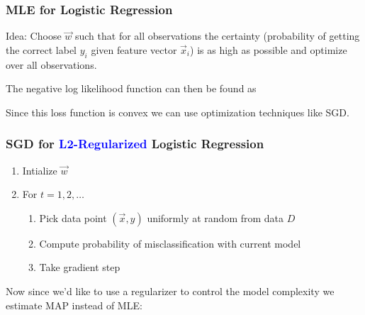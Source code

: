 \documentclass[8pt,a4paper]{scrartcl}
\newcommand{\Argmax}[2]{\text{arg}\underset{#1}{\max}\left(#2\right)}
\begin{document}
\begin{multicols*}{3}
\begin{itemize}
\end{itemize}

\subsubsection{MLE for Logistic Regression}

\mportant{$\hat{\vec{w}}=\Argmax{\vec{w}}{\prod\limits_{i=1}^n P(y_i|\vec{x}_i,\vec{w})}$}

Idea: Choose $\vec{w}$ such that for all observations the certainty (probability of getting the correct label $y_i$ given feature vector $\vec{x}_i$) is as high as possible and optimize over all observations.

\vspace{3ex}

The negative log likelihood function can then be found as 


Since this loss function is convex we can use optimization techniques like SGD.

\subsubsection{SGD for \textcolor{blue}{L2-Regularized} Logistic Regression}

\begin{enumerate}
\ncompaq
\item Intialize $\vec{w}$
\item For $t=1,2,\ldots$
\begin{enumerate}
\ncompaq
\item Pick data point $(\vec{x},y)$ uniformly at random from data $D$
\item Compute probability of misclassification with current model


\item Take gradient step

\end{enumerate}
\end{enumerate}

Now since we'd like to use a regularizer to control the model complexity we estimate MAP instead of MLE:


\end{multicols*}
\end{document}
